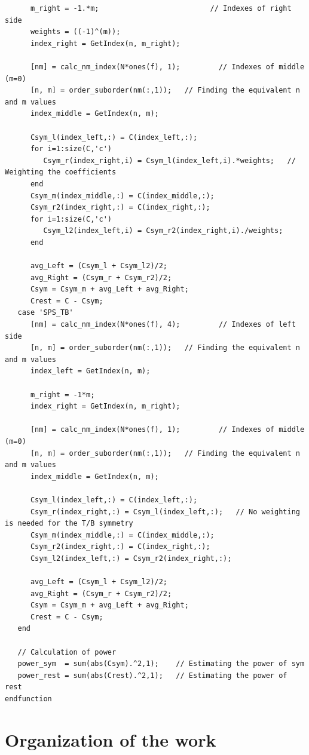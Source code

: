 \documentclass{report}
\begin{document}
\begin{appendices}
\begin{lstlisting}
      m_right = -1.*m;                          // Indexes of right side
      weights = ((-1)^(m));
      index_right = GetIndex(n, m_right);
      
      [nm] = calc_nm_index(N*ones(f), 1);         // Indexes of middle (m=0)
      [n, m] = order_suborder(nm(:,1));   // Finding the equivalent n and m values
      index_middle = GetIndex(n, m);
      
      Csym_l(index_left,:) = C(index_left,:);      
      for i=1:size(C,'c')
         Csym_r(index_right,i) = Csym_l(index_left,i).*weights;   // Weighting the coefficients
      end
      Csym_m(index_middle,:) = C(index_middle,:);      
      Csym_r2(index_right,:) = C(index_right,:);
      for i=1:size(C,'c')
         Csym_l2(index_left,i) = Csym_r2(index_right,i)./weights;
      end 
      
      avg_Left = (Csym_l + Csym_l2)/2;
      avg_Right = (Csym_r + Csym_r2)/2;
      Csym = Csym_m + avg_Left + avg_Right;
      Crest = C - Csym;
   case 'SPS_TB'
      [nm] = calc_nm_index(N*ones(f), 4);         // Indexes of left side
      [n, m] = order_suborder(nm(:,1));   // Finding the equivalent n and m values
      index_left = GetIndex(n, m);
      
      m_right = -1*m;
      index_right = GetIndex(n, m_right);
      
      [nm] = calc_nm_index(N*ones(f), 1);         // Indexes of middle (m=0)
      [n, m] = order_suborder(nm(:,1));   // Finding the equivalent n and m values
      index_middle = GetIndex(n, m);
      
      Csym_l(index_left,:) = C(index_left,:);
      Csym_r(index_right,:) = Csym_l(index_left,:);   // No weighting is needed for the T/B symmetry
      Csym_m(index_middle,:) = C(index_middle,:);      
      Csym_r2(index_right,:) = C(index_right,:);
      Csym_l2(index_left,:) = Csym_r2(index_right,:);
      
      avg_Left = (Csym_l + Csym_l2)/2;
      avg_Right = (Csym_r + Csym_r2)/2;      
      Csym = Csym_m + avg_Left + avg_Right;
      Crest = C - Csym;
   end
   
   // Calculation of power
   power_sym  = sum(abs(Csym).^2,1);    // Estimating the power of sym
   power_rest = sum(abs(Crest).^2,1);   // Estimating the power of rest
endfunction
\end{lstlisting}


\chapter{Organization of the work}



\end{appendices}
\end{document}
